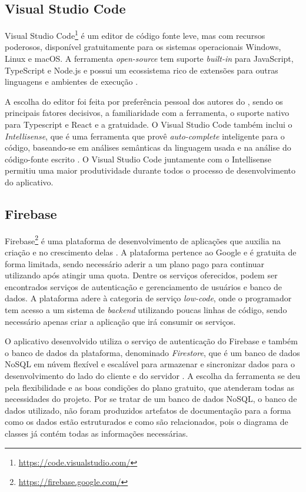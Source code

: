 \subsection{Visual Studio Code}

Visual Studio Code\footnote{\url{https://code.visualstudio.com/}} é um editor de código fonte leve, mas com recursos poderosos, disponível gratuitamente para os sistemas operacionais Windows, Linux e macOS. A ferramenta \textit{open-source} tem suporte \textit{built-in} para JavaScript, TypeScript e Node.js e possui um ecossistema rico de extensões para outras linguagens e ambientes de execução \cite{vscode}.

A escolha do editor foi feita por preferência pessoal dos autores do \appName, sendo os principais fatores decisivos, a familiaridade com a ferramenta, o suporte nativo para Typescript e React e a gratuidade. O Visual Studio Code também inclui o \textit{Intellisense}, que é uma ferramenta que provê \textit{auto-complete} inteligente para o código, baseando-se em análises semânticas da linguagem usada e na análise do código-fonte escrito \cite{intellisense}. O Visual Studio Code juntamente com o Intellisense permitiu uma maior produtividade durante todos o processo de desenvolvimento do aplicativo.

\subsection{Firebase}
\label{firebase}

Firebase\footnote{\url{https://firebase.google.com/}} é uma plataforma de desenvolvimento de aplicações que auxilia na criação e no crescimento delas \cite{firebase}. A plataforma pertence ao Google e é gratuita de forma limitada, sendo necessário aderir a um plano pago para continuar utilizando após atingir uma quota. Dentre os serviços oferecidos, podem ser encontrados serviços de autenticação e gerenciamento de usuários e banco de dados. A plataforma adere à categoria de serviço \textit{low-code}, onde o programador tem acesso a um sistema de \textit{backend} utilizando poucas linhas de código, sendo necessário apenas criar a aplicação que irá consumir os serviços.

O aplicativo desenvolvido utiliza o serviço de autenticação do Firebase e também o banco de dados da plataforma, denominado \textit{Firestore}, que é um banco de dados NoSQL em núvem flexível e escalável para armazenar e sincronizar dados para o desenvolvimento do lado do cliente e do servidor \cite{firestore}. A escolha da ferramenta se deu pela flexibilidade e as boas condições do plano gratuito, que atenderam todas as necessidades do projeto. Por se tratar de um banco de dados NoSQL, o banco de dados utilizado, não foram produzidos artefatos de documentação para a forma como os dados estão estruturados e como são relacionados, pois o diagrama de classes já contém todas as informações necessárias. 
